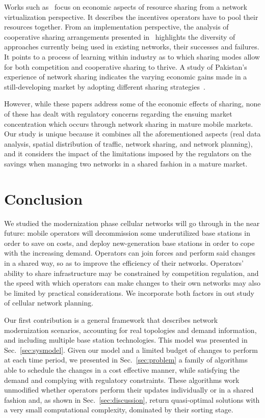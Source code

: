 \documentclass[10pt,journal,cspaper,compsoc]{IEEEtran}
\newcommand{\Sec}[1]{Sec.~\ref{sec:#1}}
\begin{document}
Works such as~\cite{coucoubertin2012} focus on economic aspects of resource sharing from a network virtualization perspective. It describes the incentives operators have to pool their resources together.
From an implementation perspective, the analysis of cooperative sharing arrangements presented in~\cite{Coopetition} highlights the diversity of approaches currently being used in existing networks, their successes and failures. It points to a process of learning within industry as to which sharing modes allow for both competition and cooperative sharing to thrive. A study of Pakistan's experience of network sharing indicates the varying economic gains made in a still-developing market by adopting different sharing strategies~\cite{pakistan}. 

However, while these papers address some of the economic effects of sharing, none of these has dealt with regulatory concerns regarding the ensuing market concentration which occurs through network sharing in mature mobile markets. Our study is unique because it combines all the aforementioned aspects (real data analysis, spatial distribution of traffic, network sharing, and network planning), and it considers the impact of the limitations imposed by the regulators on the savings when managing two networks in a shared fashion in a mature market.

\section{Conclusion}
\label{sec:conclusion}

We studied the modernization phase cellular networks will go through in the near future:
mobile operators will decommission some underutilized base stations in order to save on costs,
and deploy new-generation base stations
in order to cope with the increasing demand.
Operators can join forces and perform said changes in a shared way, so as to improve the efficiency
of their networks.
Operators' ability to share infrastructure may be constrained by competition regulation, and
the speed with which operators can make changes to their own networks may also be limited by
practical considerations. We incorporate both factors in out study of cellular network planning.

Our first contribution is a
general framework that describes
network modernization scenarios, accounting for real topologies and demand information,
and including multiple base station technologies. This model was presented in \Sec{sysmodel}.
Given our model and a limited budget of changes
to perform at each time period, we presented in \Sec{problem} a family of algorithms
able to schedule the changes in a cost effective manner, while satisfying the demand
and complying with regulatory constraints. These algorithms work unmodified whether operators
perform their updates individually or in a shared fashion and, as shown in \Sec{discussion},
return quasi-optimal solutions with a very small computational complexity,
dominated by their sorting stage.
\end{document}
